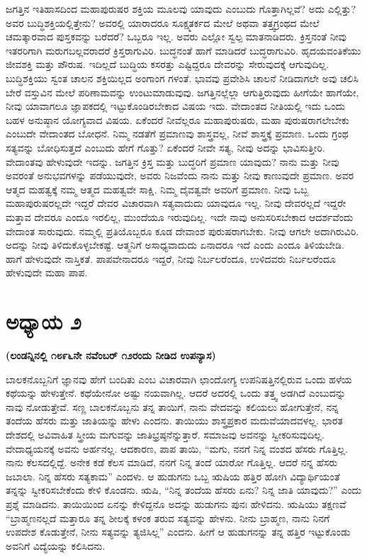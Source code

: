 ಜಗತ್ತಿನ ಇತಿಹಾಸದಿಂದ ಮಹಾಪುರುಷರ ಶಕ್ತಿಯ ಮೂಲವು ಯಾವುದು ಎಂಬುದು ಗೊತ್ತಾಗಿಲ್ಲವೆ? ಅದು ಎಲ್ಲಿತ್ತು? ಅವರ ಬುದ್ಧಿಶಕ್ತಿಯಲ್ಲಿತ್ತೇನು? ಅವರಲ್ಲಿ ಯಾರಾದರೂ ಸೂಕ್ಷ್ಮತರ್ಕದ ಮೇಲೆ ಅಥವಾ ತತ್ತ್ವಗ್ರಂಥದ ಮೇಲೆ ಚಮತ್ಕಾರವಾದ ಪುಸ್ತಕವನ್ನು ಬರೆದರೆ? ಒಬ್ಬರೂ ಇಲ್ಲ. ಅವರು ಎಲ್ಲೋ ಸ್ವಲ್ಪ ಮಾತನಾಡಿದರು. ಕ್ರಿಸ್ತನಂತೆ ನೀವು ಇತರರಿಗಾಗಿ ಮರುಗಬಲ್ಲವರಾದರೆ ಕ್ರಿಸ್ತರಾಗುವಿರಿ. ಬುದ್ಧನಂತೆ ಹಾಗೆ ಮಾಡಿದರೆ ಬುದ್ಧರಾಗುವಿರಿ. ಹೃದಯವಂತಿಕೆಯು ಜೀವಶಕ್ತಿ ಮತ್ತು ಪೌರುಷ. ಇದಿಲ್ಲದೆ ಬುದ್ಧಿಯ ಕಸರತ್ತು ಎಷ್ಟಿದ್ದರೂ ದೇವರನ್ನು ಸೇರುವುದಕ್ಕೆ ಆಗುವುದಿಲ್ಲ. ಬುದ್ಧಿಶಕ್ತಿಯು ಸ್ವಂತ ಚಾಲನ ಶಕ್ತಿಯಿಲ್ಲದ ಅಂಗಾಂಗ ಗಳಂತೆ. ಭಾವವು ಪ್ರವೇಶಿಸಿ ಚಾಲನೆ ನೀಡಿದಾಗಲೇ ಅವು ಚಲಿಸಿ ಬೇರೆ ವಸ್ತುವಿನ ಮೇಲೆ ಪರಿಣಾಮವನ್ನು ಉಂಟುಮಾಡುವುವು. ಜಗತ್ತಿನಲ್ಲೆಲ್ಲಾ ಆಗುತ್ತಿರುವುದು ಹೀಗೆಯೇ ಹಾಗೆಯೇ, ನೀವು ಯಾವಾಗಲೂ ಜ್ಞಾಪಕದಲ್ಲಿ ಇಟ್ಟುಕೊಂಡಿರಬೇಕಾದ ವಿಷಯ ಇದು. ವೇದಾಂತದ ನೀತಿಯಲ್ಲಿ ಇದು ಒಂದು ಬಹಳ ಅನುಷ್ಠಾನ ಯೋಗ್ಯವಾದ ವಿಷಯ. ಏಕೆಂದರೆ ನೀವೆಲ್ಲರೂ ಮಹಾಪುರುಷರು, ಮಹಾ ಪುರುಷರಾಗಲೇಬೇಕು ಎಂಬುದೇ ವೇದಾಂತದ ಬೋಧನೆ. ನಿಮ್ಮ ನಡತೆಗೆ ಪ್ರಮಾಣವು ಶಾಸ್ತ್ರವಲ್ಲ, ನೀವೆ ಶಾಸ್ತ್ರಕ್ಕೆ ಪ್ರಮಾಣ. ಒಂದು ಗ್ರಂಥ ಸತ್ಯವನ್ನು ಬೋಧಿಸುತ್ತದೆ ಎಂಬುದು ಹೇಗೆ ಗೊತ್ತು? ಏಕೆಂದರೆ ನೀವೇ ಸತ್ಯ, ನೀವು ಅದನ್ನು ಭಾವಿಸುತ್ತೀರಿ. ವೇದಾಂತವು ಹೇಳುವುದೇ ಇದನ್ನು. ಜಗತ್ತಿನ ಕ್ರಿಸ್ತ ಮತ್ತು ಬುದ್ಧರಿಗೆ ಪ್ರಮಾಣ ಯಾವುದು? ನಾನು ಮತ್ತು ನೀವು ಅವರಂತೆ ಅನುಭವಗಳನ್ನು ಪಡೆಯುವುದೇ, ಅವರು ನಿಜವೆಂದು ನಾನು ಮತ್ತು ನೀವು ಕಾಣುವುದೇ ಪ್ರಮಾಣ. ಅವರ ಆತ್ಮದ ಮಹತ್ವಕ್ಕೆ ನಮ್ಮ ಆತ್ಮದ ಮಹತ್ವವೇ ಸಾಕ್ಷಿ. ನಿಮ್ಮ ದೈವತ್ವವೇ ಅವರಿಗೆ ಪ್ರಮಾಣ. ನೀವು ಒಬ್ಬ ಮಹಾಪುರುಷರಲ್ಲದೇ ಇದ್ದರೆ ದೇವರ ವಿಚಾರವಾಗಿ ಸತ್ಯವಾದುದು ಯಾವುದೂ ಇಲ್ಲ. ನೀವು ದೇವರಲ್ಲದೆ ಇದ್ದರೇ ಮತ್ತಾವ ದೇವರೂ ಎಂದೂ ಇರಲಿಲ್ಲ, ಮುಂದೆಯೂ ಇರುವುದಿಲ್ಲ. ಇದೇ ನಾವು ಅನುಸರಿಸಬೇಕಾದ ಆದರ್ಶವೆಂದು ವೇದಾಂತ ಸಾರುವುದು. ನಮ್ಮಲ್ಲಿ ಪ್ರತಿಯೊಬ್ಬರೂ ಕೂಡ ದೇವಾಂಶ ಪುರುಷರಾಗಬೇಕು. ನೀವು ಆಗಲೇ ಅದಾಗಿರುವಿರಿ. ಅದನ್ನು ನೀವು ತಿಳಿದುಕೊಳ್ಳಬೇಕಷ್ಟೆ. ಆತ್ಮನಿಗೆ ಅಸಾಧ್ಯವಾದುದು ಏನಾದರೂ ಇದೆ ಎಂದು ಎಂದೂ ತಿಳಿಯಬೇಡಿ. ಹಾಗೆ ಹೇಳುವುದೇ ನಾಸ್ತಿಕತೆ. ಪಾಪವೇನಾದರೂ ಇದ್ದರೆ, ನೀವು ನಿರ್ಬಲರೆಂದೂ, ಉಳಿದವರು ನಿರ್ಬಲರೆಂದೂ ಹೇಳುವುದೇ ಮಹಾ ಪಾಪ.

\chapter{ಅಧ್ಯಾಯ ೨}

\begin{center}
\textbf{(ಲಂಡನ್ನಿನಲ್ಲಿ ೧೮೯೬ನೇ ನವೆಂಬರ್​ ೧೨ರಂದು ನೀಡಿದ ಉಪನ್ಯಾಸ)}
\end{center}

ಬಾಲಕನೊಬ್ಬನಿಗೆ ಜ್ಞಾನವು ಹೇಗೆ ಬಂದಿತು ಎಂಬ ವಿಚಾರವಾಗಿ ಛಾಂದೋಗ್ಯ ಉಪನಿಷತ್ತಿನಲ್ಲಿರುವ ಒಂದು ಹಳೆಯ ಕಥೆಯನ್ನು ಹೇಳುತ್ತೇನೆ. ಕಥೆಯೇನೋ ಅಷ್ಟು ನಯವಾಗಿಲ್ಲ. ಆದರೆ ಅದರಲ್ಲಿ ಒಂದು ತತ್ತ್ವ ಅಡಗಿದೆ ಎಂಬುದನ್ನು ನಾವು ನೋಡುತ್ತೇವೆ. ಸಣ್ಣ ಬಾಲಕನೊಬ್ಬನು ತನ್ನ ತಾಯಿಗೆ, ನಾನು ವೇದವನ್ನು ಕಲಿಯಲು ಹೋಗುತ್ತೇನೆ, ನನ್ನ ತಂದೆಯ ಹೆಸರು ಮತ್ತು ಜಾತಿಯನ್ನು ಹೇಳು ಎಂದನು. ತಾಯಿಯು ಶಾಸ್ತ್ರಪ್ರಕಾರ ಮದುವೆಯಾದವಳಲ್ಲ. ಭಾರತ ದೇಶದಲ್ಲಿ ಅವಿವಾಹಿತ ಸ್ತ್ರೀಯ ಮಗುವನ್ನು ಜಾತಿಭ್ರಷ್ಠನೆನ್ನುತ್ತಾರೆ. ಸಮಾಜವು ಅವನನ್ನು ಸ್ವೀಕರಿಸುವುದಿಲ್ಲ. ವೇದಾಧ್ಯಯನಕ್ಕೆ ಅವನು ಅರ್ಹನಲ್ಲ. ಆದಕಾರಣ, ಪಾಪ ತಾಯಿ, “ಮಗು, ನನಗೆ ನಿನ್ನ ವಂಶದ ಹೆಸರು ಗೊತ್ತಿಲ್ಲ. ನಾನು ಕೆಲಸದಲ್ಲಿದ್ದೆ. ಅನೇಕ ಕಡೆ ಕೆಲಸ ಮಾಡಿದೆ, ನನಗೆ ನಿನ್ನ ತಂದೆ ಯಾರೋ ಗೊತ್ತಿಲ್ಲ. ಆದರೆ ನನ್ನ ಹೆಸರು ಜಬಾಲಾ. ನಿನ್ನ ಹೆಸರು ಸತ್ಯಕಾಮ” ಎಂದಳು. ಆ ಹುಡುಗನು ಒಬ್ಬ ಋಷಿಯ ಹತ್ತಿರ ಹೋಗಿ ವಿದ್ಯಾರ್ಥಿಯಂತೆ ತನ್ನನ್ನು ಸ್ವೀಕರಿಸಬೇಕೆಂದು ಕೇಳಿ ಕೊಂಡನು. ಋಷಿ, “ನಿನ್ನ ತಂದೆಯ ಹೆಸರು ಏನು? ನಿನ್ನ ಜಾತಿ ಯಾವುದು?” ಎಂದು ಪ್ರಶ್ನೆ ಮಾಡಿದನು. ತಾಯಿಯಿಂದ ಏನನ್ನು ಕೇಳಿದ್ದನೊ ಅದನ್ನು ಹುಡುಗನು ಪುನಃ ಹೇಳಿದನು. ಋಷಿಯು ತಕ್ಷಣವೆ “ಬ್ರಾಹ್ಮಣನಲ್ಲದೆ ಮತ್ತಾರೂ ತನ್ನ ಶೀಲಕ್ಕೆ ಕಳಂಕ ತರುವ ಸತ್ಯವನ್ನು ಹೇಳನು. ನೀನು ಬ್ರಾಹ್ಮಣ, ನಾನು ನಿನಗೆ ಉಪದೇಶ ಕೊಡುತ್ತೇನೆ, ನೀನು ಸತ್ಯವನ್ನು ತ್ಯಜಿಸಿಲ್ಲ” ಎಂದನು. ಹೀಗೆ ಆ ಹುಡುಗನನ್ನು ತನ್ನ ಹತ್ತಿರ ಇಟ್ಟುಕೊಂಡು ಅವನಿಗೆ ವಿದ್ಯೆಯನ್ನು ಕಲಿಸಿದನು.

